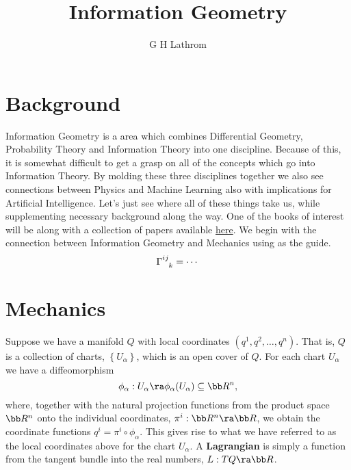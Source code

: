 \documentclass[12pt,letterpaper]{article}
\title{Information Geometry}
\author{G H Lathrom}
\begin{document}
\maketitle



\pagestyle{fancy}
\fancyhf{}
\chead{}
\fancyfoot[C]{\thepage}
\renewcommand{\headrulewidth}{.5pt}

\section{Background}

Information Geometry is a area which combines Differential Geometry,
Probability Theory and Information Theory into one discipline.  Because of
this, it is somewhat difficult to get a grasp on all of the concepts which go
into Information Theory.  By molding these three disciplines together we also
see connections between Physics and Machine Learning also with implications
for Artificial Intelligence.  Let's just see where all of these things take
us, while supplementing necessary background along the way.  One of the books
of interest will be \cite{dodson} along with a collection of papers available
\href{https://mega.nz/folder/5w0CDDzR\#EUMxMbyRJdNSKsqKIuEyFg}{here}.  We begin
with the connection between Information Geometry and Mechanics using
\cite{leok1} as the guide.  \begin{equation*} \tensor{\Gamma}{^{ij}_{k}} =
    \cdots \end{equation*}

\section{Mechanics}

Suppose we have a manifold $Q$ with local coordinates $(q^1,q^2,\ldots,q^n)$.
That is, $Q$ is a collection of charts, $\left\{ U_\alpha \right\}$, which is an
open cover of $Q$.  For each chart $U_\alpha$ we have a diffeomorphism
\begin{equation*} \phi_\alpha:U_\alpha \ra \phi_\alpha(U_\alpha) \subseteq \bb
    R^n, \end{equation*} where, together with the natural projection functions
    from the product space $\bb R^n$ onto the individual coordinates, $\pi^i
    :\bb R^n \ra \bb R$,  we obtain the coordinate functions $q^i = \pi^i \circ
    \phi_\alpha$.  This gives rise to what we have referred to as the local
    coordinates above for the chart $U_\alpha$.  A \textbf{Lagrangian} is simply
    a function from the tangent bundle into the real numbers, $L:TQ \ra \bb R$.
\end{document}
